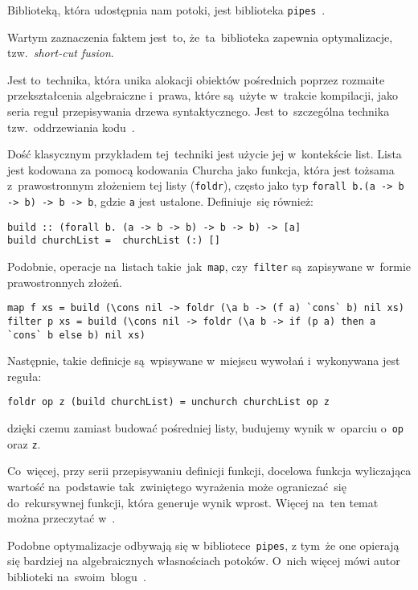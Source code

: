 \documentclass[../../praca.tex]{subfiles}
\begin{document}
Biblioteką, która udostępnia nam potoki, jest biblioteka \texttt{pipes}~\cite{Hackage:Pipes}.

Wartym zaznaczenia faktem jest~to, że~ta~biblioteka zapewnia optymalizacje,
tzw.~\emph{short-cut fusion}. 

Jest to~technika, która unika alokacji obiektów pośrednich poprzez rozmaite
przekształcenia algebraiczne i~prawa, które są~użyte w~trakcie kompilacji,
jako seria reguł przepisywania drzewa syntaktycznego. Jest to~szczególna
technika tzw.~oddrzewiania kodu~\cite{Gill:SCD}.

Dość klasycznym przykładem tej~techniki jest użycie jej w~kontekście list.
Lista jest kodowana za pomocą kodowania Churcha jako funkcja, która jest
tożsama z~prawostronnym złożeniem tej listy (\texttt{foldr}), często jako typ
\texttt{forall b.(a -> b -> b) -> b -> b}, gdzie \texttt{a}
jest ustalone.
Definiuje~się również:
\begin{verbatim}
build :: (forall b. (a -> b -> b) -> b -> b) -> [a]
build churchList =  churchList (:) []
\end{verbatim}

Podobnie, operacje na~listach takie~jak~\texttt{map}, czy~\texttt{filter} 
są~zapisywane w~formie prawostronnych złożeń.

\begin{verbatim}
map f xs = build (\cons nil -> foldr (\a b -> (f a) `cons` b) nil xs)
filter p xs = build (\cons nil -> foldr (\a b -> if (p a) then a `cons` b else b) nil xs)
\end{verbatim}

Następnie, takie definicje są~wpisywane w~miejscu wywołań i~wykonywana jest reguła:
\begin{verbatim}
foldr op z (build churchList) = unchurch churchList op z
\end{verbatim}
dzięki czemu zamiast budować pośredniej listy, budujemy wynik
w~oparciu o~\texttt{op} oraz \texttt{z}.

Co~więcej, przy serii przepisywaniu definicji funkcji, docelowa funkcja wyliczająca
wartość na~podstawie tak~zwiniętego wyrażenia może ograniczać~się do~rekursywnej funkcji,
która generuje wynik wprost. Więcej na~ten temat można przeczytać w~\cite{Gill:SCD}.

Podobne optymalizacje odbywają się w bibliotece~\texttt{pipes}, z tym~że one opierają się
bardziej na algebraicznych własnościach potoków. O~nich więcej mówi autor biblioteki
na~swoim~blogu~\cite{Gonzalez:SFP}.
\end{document}

